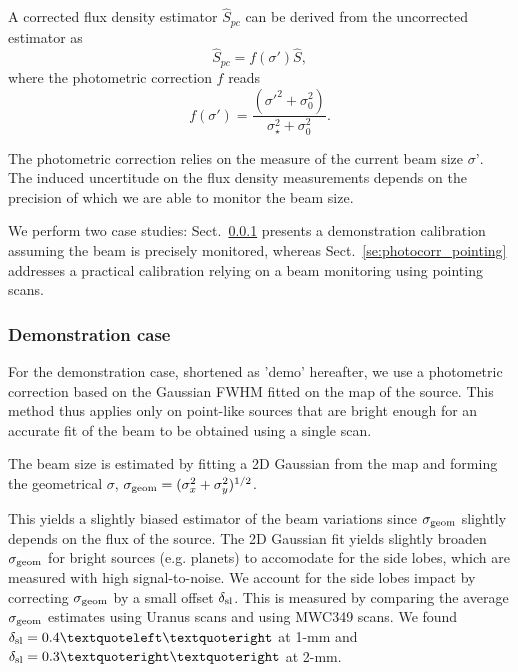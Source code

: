 A corrected flux density estimator $\hat{S}_{pc}$ can be derived from
the uncorrected estimator as
\begin{equation}
  \hat{S}_{pc} = f(\sigma')\hat{S},  
\end{equation} 
where the photometric correction $f$ reads
\begin{equation}
  f(\sigma') = \frac{(\sigma'^2 + \sigma_0^2)}{\sigma_{\star}^2 + \sigma_0^2}. 
\end{equation} 

The photometric correction relies on the measure of the current beam
size $\sigma ’$. The induced uncertitude on the flux density
measurements depends on the precision of which we are able to monitor
the beam size. 

We perform two case studies: Sect.~\ref{se:photocorr_demo} presents a demonstration
calibration assuming the beam is precisely monitored, whereas
Sect.~\ref{se:photocorr_pointing} addresses a practical calibration relying
on a beam monitoring using pointing scans. 

\subsubsection{Demonstration case}
\label{se:photocorr_demo}

For the demonstration case, shortened as 'demo' hereafter, we use a
photometric correction based on the Gaussian FWHM fitted on the map
of the source. This method thus applies only on point-like
sources that are bright enough for an accurate fit of the beam to be
obtained using a single scan.  

The beam size is estimated by fitting a 2D Gaussian from the map and
forming the geometrical $\sigma$, $\sigma_{\rm{geom}} = (\sigma_x^2 +
\sigma_y^2)^{1/2}$.  

This yields a slightly biased estimator of the beam variations since
$\sigma_{\rm geom}$ slightly depends on the flux of the source. The 2D
Gaussian fit yields slightly broaden $\sigma_{\rm{geom}}$ for bright
sources (e.g. planets) to accomodate for the side lobes, which are
measured with high signal-to-noise. We account for the side lobes
impact by correcting $\sigma_{\rm{geom}}$ by a small offset
$\delta_{\rm{sl}}$. This is measured by comparing the
average $\sigma_{\rm{geom}}$ estimates using Uranus scans and using
MWC349 scans.
We found $\delta_{\rm{sl}} = 0.4‘’$ at 1-mm and $\delta_{\rm{sl}} =
0.3’’$ at 2-mm. 





